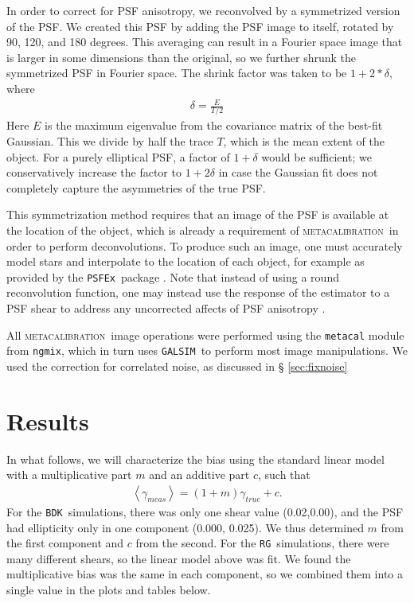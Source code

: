 \documentclass[iop, twocolappendix, appendixfloats, numberedappendix, apj]{emulateapj}
\newcommand{\mcal}{\textsc{metacalibration}}
\newcommand{\psfex}{\texttt{PSFEx}}
\newcommand{\nsimShear}{0.02,0.00}
\newcommand{\ngmix}{\texttt{ngmix}}
\newcommand{\bdksim}{\texttt{BDK}}
\newcommand{\rgsim}{\texttt{RG}}
\newcommand{\galsim}{\texttt{GALSIM}}
\begin{document}
In order to correct for PSF anisotropy, we reconvolved by a symmetrized version
of the PSF. We created this PSF by adding the PSF image to itself, rotated by
90, 120, and 180 degrees.  This averaging can result in a Fourier space image
that is larger in some dimensions than the original, so we further shrunk
the symmetrized PSF in Fourier space.  The shrink factor was taken to be
$1+2*\delta$, where
\begin{align}
    \delta = \frac{E}{T/2}
\end{align}
Here $E$ is the maximum eigenvalue from the covariance matrix of the best-fit
Gaussian. This we divide by half the trace $T$, which is the mean extent of the
object.  For a purely elliptical PSF, a factor of $1+\delta$ would be
sufficient; we conservatively increase the factor to $1+2\delta$ in case the
Gaussian fit does not completely capture the asymmetries of the true PSF.

This symmetrization method requires that an image of the PSF is available at
the location of the object, which is already a requirement of \mcal\ in order
to perform deconvolutions.  To produce such an image, one must accurately model
stars and interpolate to the location of each object, for example as provided
by the \psfex\ package \citep{BertinPSFEx2011}.  Note that instead of using a
round reconvolution function, one may instead use the response of the estimator
to a PSF shear to address any uncorrected affects of PSF anisotropy
\citep{HuffMcal}.

All \mcal\ image operations were performed using the \texttt{metacal} module
from \ngmix, which in turn uses \galsim\ to perform most image manipulations.
We used the correction for correlated noise, as discussed in \S
\ref{sec:fixnoise}


\section{Results} \label{sec:results}

In what follows, we will characterize the bias using the standard linear model
\citep[e.g.][]{great3} with a multiplicative part $m$ and an additive part $c$,
such that
\begin{align}
	\left< \gamma_{meas} \right> = (1+m) \gamma_{true} + c.
\end{align}
For the \bdksim\ simulations, there was only one shear value (\nsimShear),
and the PSF had ellipticity only in one component (0.000, 0.025). We
thus determined $m$ from the first component and $c$ from the
second.  For the \rgsim\ simulations, there were many different shears,
so the linear model above was fit.  We found the multiplicative
bias was the same in each component, so we combined them into
a single value in the plots and tables below.
\end{document}
